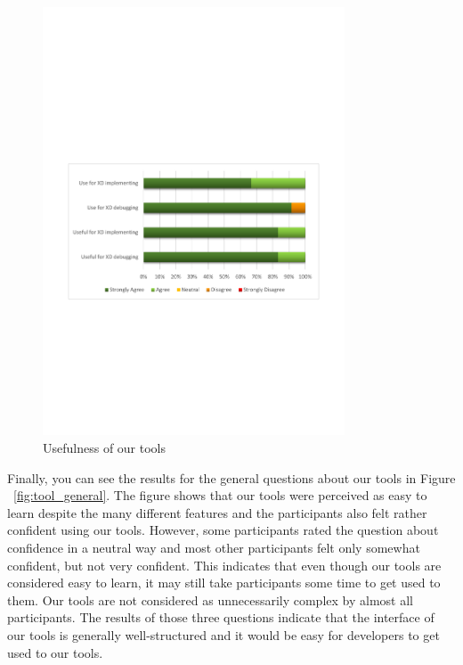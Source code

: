 \begin{figure}[H]
  \centering
    \includegraphics[width=0.8\textwidth]{images/charts/usefulness_tool.pdf}
	\caption{Usefulness of our tools}
	\label{fig:usefulness_tool}
\end{figure}

Finally, you can see the results for the general questions about our tools in Figure ~\ref{fig:tool_general}. The figure shows that our tools were perceived as easy to learn despite the many different features and the participants also felt rather confident using our tools. However, some participants rated the question about confidence in a neutral way and most other participants felt only somewhat confident, but not very confident. This indicates that even though our tools are considered easy to learn, it may still take participants some time to get used to them. Our tools are not considered as unnecessarily complex by almost all participants. The results of those three questions indicate that the interface of our tools is generally well-structured and it would be easy for developers to get used to our tools.

